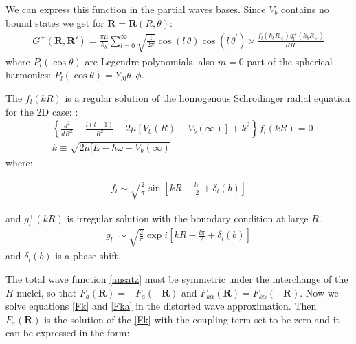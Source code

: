 We can express this function in the partial waves bases. Since $ V_b $ contains no bound states we get for $ \mathbf{R} = \mathbf{R}(R,\theta) $:
\begin{equation}\label{GreenFka}
\begin{split}
G^{+}(\mathbf{R}, \mathbf{R}') =  \frac{\pi\mu}{k_b}\sum_{l=0}^{\infty}{\sqrt{\frac{1}{2\pi}}\cos(l\,\theta)\cos(l\,\theta^{'})}\times \frac{f_l(k_bR_{<})g^{+}_l(k_bR_{>})}{RR'}
\end{split}
\end{equation}
where $ P_l(\cos\theta) $ are Legendre polynomials, also $ m = 0 $ part of the spherical harmonics:  $ P_l(\cos\theta) = Y_{l0}{\theta,\phi} $. 

The $ f_l(k R) $ is a regular solution of the homogenous Schrodinger radial  equation for the 2D case: \cite{H2atom}:
\begin{equation}\label{eqRadial1}
\begin{split}
& \left\{\frac{d^2}{dR^2} - \frac{l(l+1)}{R^2} - 2\mu\left[V_b(R) - V_b(\infty)\right] + k^2\right\}f_l(kR) = 0 \\[.8em]
& k \equiv \sqrt{2\mu[E - \hbar\omega - V_b(\infty)}
\end{split}
\end{equation}
where:

\begin{equation}
\begin{split}
f_{l} \sim \sqrt{\frac{2}{\pi}}\sin\left[kR - \frac{l\pi}{2} + \delta_l(b)\right]
\end{split}
\end{equation}

and $ g^{+}_l(kR) $ is irregular solution with the boundary condition at large $ R $.
\begin{equation}
\begin{split}
g^{+}_{l} \sim \sqrt{\frac{2}{\pi}}\exp i\left[kR - \frac{l\pi}{2} + \delta_l(b)\right]
\end{split}
\end{equation}
and $  \delta_l(b) $ is a phase shift. 

The total wave function \eqref{ansatz} must be symmetric under the interchange of the $ H $ nuclei, so that $ F_a(\mathbf{R}) = -F_a(-\mathbf{R}) $ and $ F_{k\alpha}(\mathbf{R}) =  F_{k\alpha}(-\mathbf{R}) $. Now we solve equations \eqref{Fk} and \eqref{Fka} in the distorted wave approximation. Then $ F_a(\mathbf{R}) $ is the solution of the \eqref{Fk} with the coupling term set to be zero and it can be expressed in the form:


